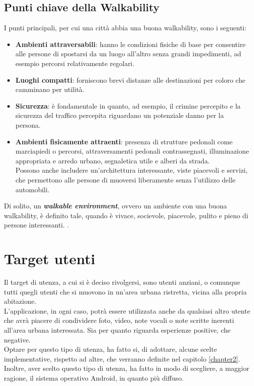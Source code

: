 \subsection{Punti chiave della Walkability}
I punti principali, per cui una città abbia una buona walkability, sono i seguenti:
\begin{itemize}
    \item \textbf{Ambienti attraversabili}: hanno le condizioni fisiche di base per consentire alle persone di spostarsi da un luogo all'altro senza grandi impedimenti, ad esempio percorsi relativamente regolari.
    \item \textbf{Luoghi compatti}: forniscono brevi distanze alle destinazioni per coloro che camminano per utilità.
    \item \textbf{Sicurezza}: è fondamentale in quanto, ad esempio, il crimine percepito e la sicurezza del traffico percepita riguardano un potenziale danno per la persona.
    \item \textbf{Ambienti fisicamente attraenti}: presenza di strutture pedonali come marciapiedi o percorsi, attraversamenti pedonali contrassegnati, illuminazione appropriata e arredo urbano, segnaletica utile e alberi da strada. 
    \\Possono anche includere un'architettura interessante, viste piacevoli e servizi, che permettono alle persone di muoversi liberamente senza l'utilizzo delle automobili.
\end{itemize}
Di solito, un \textit{\textbf{walkable environment}}, ovvero un ambiente con una buona walkability, è definito tale, quando è vivace, socievole, piacevole, pulito e pieno di persone interessanti.
\cite{walkable}.

\section{Target utenti}

Il target di utenza, a cui si è deciso rivolgersi, sono utenti anziani, o comunque tutti quegli utenti che si muovono in un'area urbana ristretta, vicina alla propria abitazione.
\\L'applicazione, in ogni caso, potrà essere utilizzata anche da qualsiasi altro utente che avrà piacere di condividere foto, video, note vocali o note scritte inerenti all'area urbana interessata. Sia per quanto riguarda esperienze positive, che negative.
\\Optare per questo tipo di utenza, ha fatto si, di adottare, alcune scelte implementative, rispetto ad altre, che verranno definite nel capitolo \ref{chapter2}.
\\Inoltre, aver scelto questo tipo di utenza, ha fatto in modo di scegliere, a maggior ragione, il sistema operativo Android, in quanto più diffuso.


